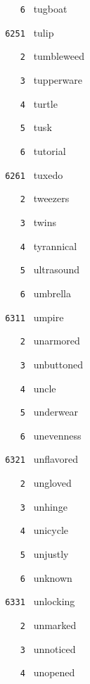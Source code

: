 \documentclass[11pt]{article}
\begin{document}
\begin{multicols}{6}
\noindent \texttt{ \ \ \ 6 } tugboat  \par
\vspace{3mm}
\noindent \texttt{ 6251 } tulip  \par
\noindent \texttt{ \ \ \ 2 } tumbleweed  \par
\noindent \texttt{ \ \ \ 3 } tupperware  \par
\noindent \texttt{ \ \ \ 4 } turtle  \par
\noindent \texttt{ \ \ \ 5 } tusk  \par
\noindent \texttt{ \ \ \ 6 } tutorial  \par
\vspace{3mm}
\noindent \texttt{ 6261 } tuxedo  \par
\noindent \texttt{ \ \ \ 2 } tweezers  \par
\noindent \texttt{ \ \ \ 3 } twins  \par
\noindent \texttt{ \ \ \ 4 } tyrannical  \par
\noindent \texttt{ \ \ \ 5 } ultrasound  \par
\noindent \texttt{ \ \ \ 6 } umbrella  \par
\noindent \texttt{ 6311 } umpire  \par
\noindent \texttt{ \ \ \ 2 } unarmored  \par
\noindent \texttt{ \ \ \ 3 } unbuttoned  \par
\noindent \texttt{ \ \ \ 4 } uncle  \par
\noindent \texttt{ \ \ \ 5 } underwear  \par
\noindent \texttt{ \ \ \ 6 } unevenness  \par
\vspace{3mm}
\noindent \texttt{ 6321 } unflavored  \par
\noindent \texttt{ \ \ \ 2 } ungloved  \par
\noindent \texttt{ \ \ \ 3 } unhinge  \par
\noindent \texttt{ \ \ \ 4 } unicycle  \par
\noindent \texttt{ \ \ \ 5 } unjustly  \par
\noindent \texttt{ \ \ \ 6 } unknown  \par
\vspace{3mm}
\noindent \texttt{ 6331 } unlocking  \par
\noindent \texttt{ \ \ \ 2 } unmarked  \par
\noindent \texttt{ \ \ \ 3 } unnoticed  \par
\noindent \texttt{ \ \ \ 4 } unopened  \par

\end{multicols}
\end{document}
